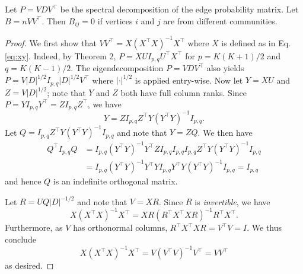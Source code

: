 \documentclass[12pt]{article}
\begin{document}
\begin{theorem}
\label{theorem3}
Let $P = V D V^\top$ be the spectral decomposition of the edge probability
matrix. Let $B = n V V^\top$. Then $B_{ij} = 0$ if vertices $i$ and $j$ are
from different communities.
\end{theorem}
\begin{proof}
We first show that $V V^\top = X (X^\top X)^{-1} X^\top$ where $X$ is 
defined as in Eq.\eqref{eq:xy}. Indeed, by Theorem 2, \(P = X U I_{p,
  q} U^\top X^\top\) for $p = K(K+1)/2$ and $q = K(K-1)/2$. %
The eigendecomposition \(P = V D V^\top\) also yields $P = V
|D|^{1/2} I_{p, q} |D|^{1/2} V^\top$ where \(|\cdot|^{1/2}\) is
applied entry-wise. Now let $Y = XU$ and $Z = V|D|^{1/2}$; note that
$Y$ and $Z$ both have full column ranks. 
Since $P = Y I_{p,q} Y^{\top} = Z I_{p,q} Z^{\top}$, we have
$$Y = Z I_{p,q} Z^{\top} Y (Y^{\top} Y)^{-1} I_{p,q}.$$
Let $Q = I_{p,q} Z^{\top} Y (Y^{\top} Y)^{-1} I_{p,q}$ and note that
$Y = Z Q$. We then have
\begin{equation*}
  \begin{split}
  Q^{\top} I_{p,q} Q &= I_{p,q} (Y^{\top} Y)^{-1} Y^{\top} Z I_{p,q}
I_{p,q} I_{p,q} Z^{\top} Y (Y^{\top} Y)^{-1} I_{p,q} \\ &= I_{p,q} (Y^{\top} Y)^{-1} Y^{\top} Y I_{p,q}
Y^{\top} Y (Y^{\top} Y)^{-1} I_{p,q} =  I_{p,q}
\end{split}
\end{equation*}
and hence $Q$ is an indefinite orthogonal matrix. 

Let $R = U Q |D|^{-1/2}$ and note that $V = XR$. Since $R$ is
{\em invertible}, we have
$$X (X^{\top} X)^{-1} X^{\top} = X R (R^{\top} X^{\top} X R)^{-1}
R^{\top} X^{\top}.$$ 
Furthermore, as $V$ has orthonormal columns, $R^{\top} X^{\top} X R =
V^{\top} V = I$. We thus conclude
$$X (X^{\top} X)^{-1} X^{\top} = V (V^{\top} V)^{-1} V^{\top} = V V^{\top}$$
as desired.


\end{proof}
\end{document}
